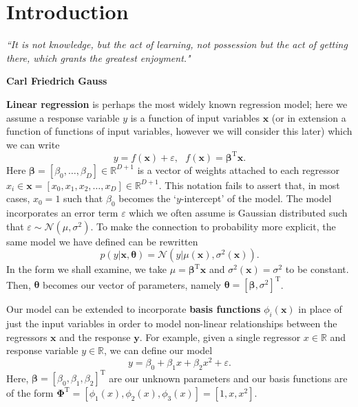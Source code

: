 \documentclass[10pt,a4paper]{article}
\numberwithin{equation}{section}
\theoremstyle{plain}
\theoremstyle{definition}
\theoremstyle{own}
\begin{document}
\section{Introduction} \label{reg:intro}
\epigraph{\textit{``It is not knowledge, but the act of learning, not possession but the act of getting there, which grants the greatest enjoyment."}}{\textbf{Carl Friedrich Gauss}}
\textbf{Linear regression} is perhaps the most widely known regression model; here we assume a response variable $y$ is a function of input variables $\mathbf{x}$ (or in extension a function of functions of input variables, however we will consider this later) which we can write
\begin{equation}
y = f(\mathbf{x}) + \varepsilon,~~~ f(\mathbf{x}) = \boldsymbol\beta^{\text{T}}\mathbf{x}.
\end{equation}
Here $\boldsymbol\beta = \left[ \beta_0, \ldots, \beta_D \right] \in \mathbb{R}^{D+1}$ is a vector of weights attached to each regressor $x_i \in \mathbf{x} = \left[ x_0, x_1, x_2, \ldots, x_D \right] \in \mathbb{R}^{D+1}$. This notation fails to assert that, in most cases, $x_0 = 1$ such that $\beta_0$ becomes the `$y$-intercept' of the model. The model incorporates an error term $\varepsilon$ which we often assume is Gaussian distributed such that $\varepsilon \sim \mathcal{N}(\mu, \sigma^2)$. To make the connection to probability more explicit, the same model we have defined can be rewritten
\begin{equation}
p(y| \mathbf{x}, \boldsymbol\theta) = \mathcal{N}(y|\mu(\mathbf{x}), \sigma^2(\mathbf{x})).
\end{equation}
In the form we shall examine, we take $\mu = \boldsymbol\beta^{\text{T}} \mathbf{x}$ and $\sigma^2(\mathbf{x}) = \sigma^2$ to be constant. Then, $\boldsymbol\theta$ becomes our vector of parameters, namely $\boldsymbol\theta = \left[ \boldsymbol\beta, \sigma^2 \right]^{\text{T}}$.

Our model can be extended to incorporate \textbf{basis functions} $\phi_i(\mathbf{x})$ in place of just the input variables in order to model non-linear relationships between the regressors $\mathbf{x}$ and the response $\mathbf{y}$. For example, given a single regressor $x \in \mathbb{R}$ and response variable $y \in \mathbb{R}$, we can define our model
\begin{equation}
y = \beta_0 + \beta_1 x + \beta_2 x^2 + \varepsilon.
\end{equation}
Here, $\boldsymbol\beta = \left[ \beta_0, \beta_1, \beta_2 \right]^{\text{T}}$ are our unknown parameters and our basis functions are of the form $\boldsymbol\Phi^{\text{T}} = \left[ \phi_1(x), \phi_2(x), \phi_3(x) \right] = \left[ 1, x, x^2 \right]$.
\end{document}
